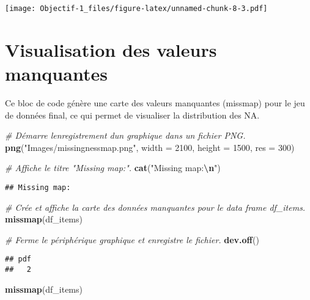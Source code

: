\documentclass[
]{article}
\newenvironment{Shaded}{\begin{snugshade}}{\end{snugshade}}
\newcommand{\AttributeTok}[1]{\textcolor[rgb]{0.13,0.29,0.53}{#1}}
\newcommand{\CommentTok}[1]{\textcolor[rgb]{0.56,0.35,0.01}{\textit{#1}}}
\newcommand{\DecValTok}[1]{\textcolor[rgb]{0.00,0.00,0.81}{#1}}
\newcommand{\FunctionTok}[1]{\textcolor[rgb]{0.13,0.29,0.53}{\textbf{#1}}}
\newcommand{\NormalTok}[1]{#1}
\newcommand{\SpecialCharTok}[1]{\textcolor[rgb]{0.81,0.36,0.00}{\textbf{#1}}}
\newcommand{\StringTok}[1]{\textcolor[rgb]{0.31,0.60,0.02}{#1}}
\begin{document}
\texttt{[image: Objectif-1\_files/figure-latex/unnamed-chunk-8-3.pdf]}

\section{Visualisation des valeurs
manquantes}\label{visualisation-des-valeurs-manquantes}

Ce bloc de code génère une carte des valeurs manquantes (missmap) pour
le jeu de données final, ce qui permet de visualiser la distribution des
NA.

\begin{Shaded}
\begin{Highlighting}[]
\CommentTok{\# Démarre l\textquotesingle{}enregistrement d\textquotesingle{}un graphique dans un fichier PNG.}
\FunctionTok{png}\NormalTok{(}\StringTok{"Images/missingnessmap.png"}\NormalTok{, }\AttributeTok{width =} \DecValTok{2100}\NormalTok{, }\AttributeTok{height =} \DecValTok{1500}\NormalTok{, }\AttributeTok{res =} \DecValTok{300}\NormalTok{)}

\CommentTok{\# Affiche le titre "Missing map:".}
\FunctionTok{cat}\NormalTok{(}\StringTok{"Missing map:}\SpecialCharTok{\textbackslash{}n}\StringTok{"}\NormalTok{)}
\end{Highlighting}
\end{Shaded}

\begin{verbatim}
## Missing map:
\end{verbatim}

\begin{Shaded}
\begin{Highlighting}[]
\CommentTok{\# Crée et affiche la carte des données manquantes pour le data frame \textquotesingle{}df\_items\textquotesingle{}.}
\FunctionTok{missmap}\NormalTok{(df\_items)}

\CommentTok{\# Ferme le périphérique graphique et enregistre le fichier.}
\FunctionTok{dev.off}\NormalTok{()}
\end{Highlighting}
\end{Shaded}

\begin{verbatim}
## pdf 
##   2
\end{verbatim}

\begin{Shaded}
\begin{Highlighting}[]
\FunctionTok{missmap}\NormalTok{(df\_items)}
\end{Highlighting}
\end{Shaded}
\end{document}
